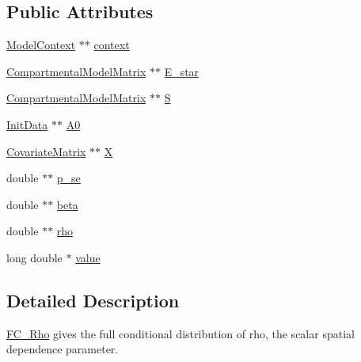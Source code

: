 \subsection*{Public Attributes}
\begin{DoxyCompactItemize}
\item 
\hyperlink{classSpatialSEIR_1_1ModelContext}{Model\-Context} $\ast$$\ast$ \hyperlink{classSpatialSEIR_1_1FC__Rho_a58528cfb80a3136fdc172a5374598ea9}{context}
\item 
\hyperlink{classSpatialSEIR_1_1CompartmentalModelMatrix}{Compartmental\-Model\-Matrix} $\ast$$\ast$ \hyperlink{classSpatialSEIR_1_1FC__Rho_a5a94d2131584e6eb0519909136fd466d}{E\-\_\-star}
\item 
\hyperlink{classSpatialSEIR_1_1CompartmentalModelMatrix}{Compartmental\-Model\-Matrix} $\ast$$\ast$ \hyperlink{classSpatialSEIR_1_1FC__Rho_a36fc3ffe9ecbcbb68a4cb5810d6cac37}{S}
\item 
\hyperlink{classSpatialSEIR_1_1InitData}{Init\-Data} $\ast$$\ast$ \hyperlink{classSpatialSEIR_1_1FC__Rho_a76cc8299c6cb0159f766fd8d14e8aee7}{A0}
\item 
\hyperlink{classSpatialSEIR_1_1CovariateMatrix}{Covariate\-Matrix} $\ast$$\ast$ \hyperlink{classSpatialSEIR_1_1FC__Rho_a7577871a252d9fe53df7f1f5838bd52e}{X}
\item 
double $\ast$$\ast$ \hyperlink{classSpatialSEIR_1_1FC__Rho_abb3e2be0acefedb35a057590415bd128}{p\-\_\-se}
\item 
double $\ast$$\ast$ \hyperlink{classSpatialSEIR_1_1FC__Rho_a31bd1ce111afce5fc0ac48d1c2a44f53}{beta}
\item 
double $\ast$$\ast$ \hyperlink{classSpatialSEIR_1_1FC__Rho_a26cefbb538d5fe978ad72496d081c5b0}{rho}
\item 
long double $\ast$ \hyperlink{classSpatialSEIR_1_1FC__Rho_a6392b4fa101f7af43ff17f6c8126e5d6}{value}
\end{DoxyCompactItemize}


\subsection{Detailed Description}
\hyperlink{classSpatialSEIR_1_1FC__Rho}{F\-C\-\_\-\-Rho} gives the full conditional distribution of rho, the scalar spatial dependence parameter. 

